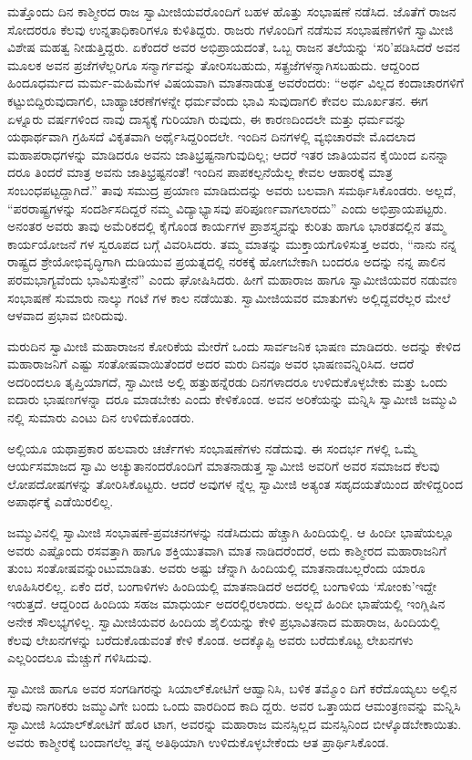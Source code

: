 ಮತ್ತೊಂದು ದಿನ ಕಾಶ್ಮೀರದ ರಾಜ ಸ್ವಾಮೀಜಿಯವರೊಂದಿಗೆ ಬಹಳ ಹೊತ್ತು ಸಂಭಾಷಣೆ ನಡೆಸಿದ. ಜೊತೆಗೆ ರಾಜನ ಸೋದರರೂ ಕೆಲವು ಉನ್ನತಾಧಿಕಾರಿಗಳೂ ಕುಳಿತಿದ್ದರು. ರಾಜರು ಗಳೊಂದಿಗೆ ನಡೆಸುವ ಸಂಭಾಷಣೆಗಳಿಗೆ ಸ್ವಾಮೀಜಿ ವಿಶೇಷ ಮಹತ್ವ ನೀಡುತ್ತಿದ್ದರು. ಏಕೆಂದರೆ ಅವರ ಅಭಿಪ್ರಾಯದಂತೆ, ಒಬ್ಬ ರಾಜನ ತಲೆಯನ್ನು ‘ಸರಿ’ಪಡಿಸಿದರೆ ಅವನ ಮೂಲಕ ಅವನ ಪ್ರಜೆಗಳೆಲ್ಲರಿಗೂ ಸನ್ಮಾರ್ಗವನ್ನು ತೋರಿಸಬಹುದು, ಸತ್ಪ್ರಜೆಗಳನ್ನಾಗಿಸಬಹುದು. ಆದ್ದರಿಂದ ಹಿಂದೂಧರ್ಮದ ಮರ್ಮ-ಮಹಿಮೆಗಳ ವಿಷಯವಾಗಿ ಮಾತನಾಡುತ್ತ ಅವರೆಂದರು: “ಅರ್ಥ ವಿಲ್ಲದ ಕಂದಾಚಾರಗಳಿಗೆ ಕಟ್ಟುಬಿದ್ದಿರುವುದಾಗಲಿ, ಬಾಹ್ಯಾಚರಣೆಗಳನ್ನೇ ಧರ್ಮವೆಂದು ಭಾವಿ ಸುವುದಾಗಲಿ ಕೇವಲ ಮೂರ್ಖತನ. ಈಗ ಏಳ್ನೂರು ವರ್ಷಗಳಿಂದ ನಾವು ದಾಸ್ಯಕ್ಕೆ ಗುರಿಯಾಗಿ ರುವುದು, ಈ ಕಾರಣದಿಂದಲೇ ಮತ್ತು ಧರ್ಮವನ್ನು ಯಥಾರ್ಥವಾಗಿ ಗ್ರಹಿಸದೆ ವಿಕೃತವಾಗಿ ಅರ್ಥೈಸಿದ್ದರಿಂದಲೇ. ಇಂದಿನ ದಿನಗಳಲ್ಲಿ ವ್ಯಭಿಚಾರವೇ ಮೊದಲಾದ ಮಹಾಪರಾಧಗಳನ್ನು ಮಾಡಿದರೂ ಅವನು ಜಾತಿಭ್ರಷ್ಟನಾಗುವುದಿಲ್ಲ; ಆದರೆ ಇತರ ಜಾತಿಯವನ ಕೈಯಿಂದ ಏನನ್ನಾ ದರೂ ತಿಂದರೆ ಮಾತ್ರ ಅವನು ಜಾತಿಭ್ರಷ್ಟನಂತೆ! ಇಂದಿನ ಪಾಪಕಲ್ಪನೆಯೆಲ್ಲ ಕೇವಲ ಆಹಾರಕ್ಕೆ ಮಾತ್ರ ಸಂಬಂಧಪಟ್ಟದ್ದಾಗಿದೆ.” ತಾವು ಸಮುದ್ರ ಪ್ರಯಾಣ ಮಾಡಿದುದನ್ನು ಅವರು ಬಲವಾಗಿ ಸಮರ್ಥಿಸಿಕೊಂಡರು. ಅಲ್ಲದೆ, “ಪರರಾಷ್ಟ್ರಗಳನ್ನು ಸಂದರ್ಶಿಸದಿದ್ದರೆ ನಮ್ಮ ವಿದ್ಯಾಭ್ಯಾಸವು ಪರಿಪೂರ್ಣವಾಗಲಾರದು” ಎಂದು ಅಭಿಪ್ರಾಯಪಟ್ಟರು. ಅನಂತರ ಅವರು ತಾವು ಅಮೆರಿಕದಲ್ಲಿ ಕೈಗೊಂಡ ಕಾರ್ಯಗಳ ಪ್ರಾಶಸ್ತ್ಯವನ್ನು ಕುರಿತು ಹಾಗೂ ಭಾರತದಲ್ಲಿನ ತಮ್ಮ ಕಾರ್ಯಯೋಜನೆ ಗಳ ಸ್ವರೂಪದ ಬಗ್ಗೆ ವಿವರಿಸಿದರು. ತಮ್ಮ ಮಾತನ್ನು ಮುಕ್ತಾಯಗೊಳಿಸುತ್ತ ಅವರು, “ನಾನು ನನ್ನ ರಾಷ್ಟ್ರದ ಶ್ರೇಯೋಭಿವೃದ್ಧಿಗಾಗಿ ದುಡಿಯುವ ಪ್ರಯತ್ನದಲ್ಲಿ ನರಕಕ್ಕೆ ಹೋಗಬೇಕಾಗಿ ಬಂದರೂ ಅದನ್ನು ನನ್ನ ಪಾಲಿನ ಪರಮಭಾಗ್ಯವೆಂದು ಭಾವಿಸುತ್ತೇನೆ” ಎಂದು ಘೋಷಿಸಿದರು. ಹೀಗೆ ಮಹಾರಾಜ ಹಾಗೂ ಸ್ವಾಮೀಜಿಯವರ ನಡುವಣ ಸಂಭಾಷಣೆ ಸುಮಾರು ನಾಲ್ಕು ಗಂಟೆ ಗಳ ಕಾಲ ನಡೆಯಿತು. ಸ್ವಾಮೀಜಿಯವರ ಮಾತುಗಳು ಅಲ್ಲಿದ್ದವರೆಲ್ಲರ ಮೇಲೆ ಆಳವಾದ ಪ್ರಭಾವ ಬೀರಿದುವು.

ಮರುದಿನ ಸ್ವಾಮೀಜಿ ಮಹಾರಾಜನ ಕೋರಿಕೆಯ ಮೇರೆಗೆ ಒಂದು ಸಾರ್ವಜನಿಕ ಭಾಷಣ ಮಾಡಿದರು. ಅದನ್ನು ಕೇಳಿದ ಮಹಾರಾಜನಿಗೆ ಎಷ್ಟು ಸಂತೋಷವಾಯಿತೆಂದರೆ ಅದರ ಮರು ದಿನವೂ ಅವರ ಭಾಷಣವನ್ನಿರಿಸಿದ. ಆದರೆ ಅದರಿಂದಲೂ ತೃಪ್ತಿಯಾಗದೆ, ಸ್ವಾಮೀಜಿ ಅಲ್ಲಿ ಹತ್ತುಹನ್ನೆರಡು ದಿನಗಳಾದರೂ ಉಳಿದುಕೊಳ್ಳಬೇಕು ಮತ್ತು ಒಂದು ಐದಾರು ಭಾಷಣಗಳನ್ನಾ ದರೂ ಮಾಡಬೇಕು ಎಂದು ಕೇಳಿಕೊಂಡ. ಅವನ ಅರಿಕೆಯನ್ನು ಮನ್ನಿಸಿ ಸ್ವಾಮೀಜಿ ಜಮ್ಮುವಿ ನಲ್ಲಿ ಸುಮಾರು ಎಂಟು ದಿನ ಉಳಿದುಕೊಂಡರು.

ಅಲ್ಲಿಯೂ ಯಥಾಪ್ರಕಾರ ಹಲವಾರು ಚರ್ಚೆಗಳು ಸಂಭಾಷಣೆಗಳು ನಡೆದುವು. ಈ ಸಂದರ್ಭ ಗಳಲ್ಲಿ ಒಮ್ಮೆ ಆರ್ಯಸಮಾಜದ ಸ್ವಾಮಿ ಅಚ್ಯುತಾನಂದರೊಂದಿಗೆ ಮಾತನಾಡುತ್ತ ಸ್ವಾಮೀಜಿ ಅವರಿಗೆ ಅವರ ಸಮಾಜದ ಕೆಲವು ಲೋಪದೋಷಗಳನ್ನು ತೋರಿಸಿಕೊಟ್ಟರು. ಆದರೆ ಅವುಗಳ ನ್ನೆಲ್ಲ ಸ್ವಾಮೀಜಿ ಅತ್ಯಂತ ಸಹೃದಯತೆಯಿಂದ ಹೇಳಿದ್ದರಿಂದ ಅಪಾರ್ಥಕ್ಕೆ ಎಡೆಯಿರಲಿಲ್ಲ.

ಜಮ್ಮುವಿನಲ್ಲಿ ಸ್ವಾಮೀಜಿ ಸಂಭಾಷಣೆ-ಪ್ರವಚನಗಳನ್ನು ನಡೆಸಿದುದು ಹೆಚ್ಚಾಗಿ ಹಿಂದಿಯಲ್ಲಿ. ಆ ಹಿಂದೀ ಭಾಷೆಯಲ್ಲೂ ಅವರು ಎಷ್ಟೊಂದು ರಸವತ್ತಾಗಿ ಹಾಗೂ ಶಕ್ತಿಯುತವಾಗಿ ಮಾತ ನಾಡಿದರೆಂದರೆ, ಅದು ಕಾಶ್ಮೀರದ ಮಹಾರಾಜನಿಗೆ ತುಂಬ ಸಂತೋಷವನ್ನುಂಟುಮಾಡಿತು. ಅವರು ಅಷ್ಟು ಚೆನ್ನಾಗಿ ಹಿಂದಿಯಲ್ಲಿ ಮಾತನಾಡಬಲ್ಲರೆಂದು ಯಾರೂ ಊಹಿಸಿರಲಿಲ್ಲ. ಏಕೆಂ ದರೆ, ಬಂಗಾಳಿಗಳು ಹಿಂದಿಯಲ್ಲಿ ಮಾತನಾಡಿದರೆ ಅದರಲ್ಲಿ ಬಂಗಾಳಿಯ ‘ಸೋಂಕು’ಇದ್ದೇ ಇರುತ್ತದೆ. ಆದ್ದರಿಂದ ಹಿಂದಿಯ ಸಹಜ ಮಾಧುರ್ಯ ಅದರಲ್ಲಿರಲಾರದು. ಅಲ್ಲದೆ ಹಿಂದೀ ಭಾಷೆಯಲ್ಲಿ ಇಂಗ್ಲಿಷಿನ ಅನೇಕ ಸೌಲಭ್ಯಗಳಿಲ್ಲ. ಸ್ವಾಮೀಜಿಯವರ ಹಿಂದಿಯ ಶೈಲಿಯನ್ನು ಕೇಳಿ ಪ್ರಭಾವಿತನಾದ ಮಹಾರಾಜ, ಹಿಂದಿಯಲ್ಲಿ ಕೆಲವು ಲೇಖನಗಳನ್ನು ಬರೆದುಕೊಡುವಂತೆ ಕೇಳಿ ಕೊಂಡ. ಅದಕ್ಕೊಪ್ಪಿ ಅವರು ಬರೆದುಕೊಟ್ಟ ಲೇಖನಗಳು ಎಲ್ಲರಿಂದಲೂ ಮೆಚ್ಚುಗೆ ಗಳಿಸಿದುವು.

ಸ್ವಾಮೀಜಿ ಹಾಗೂ ಅವರ ಸಂಗಡಿಗರನ್ನು ಸಿಯಾಲ್​ಕೋಟಿಗೆ ಆಹ್ವಾನಿಸಿ, ಬಳಿಕ ತಮ್ಮೊಂ ದಿಗೆ ಕರೆದೊಯ್ಯಲು ಅಲ್ಲಿನ ಕೆಲವು ನಾಗರಿಕರು ಜಮ್ಮುವಿಗೇ ಬಂದು ಒಂದು ವಾರದಿಂದ ಕಾದಿ ದ್ದರು. ಅವರ ಒತ್ತಾಯದ ಆಮಂತ್ರಣವನ್ನು ಮನ್ನಿಸಿ ಸ್ವಾಮೀಜಿ ಸಿಯಾಲ್​ಕೋಟಿಗೆ ಹೊರ ಟಾಗ, ಅವರನ್ನು ಮಹಾರಾಜ ಮನಸ್ಸಿಲ್ಲದ ಮನಸ್ಸಿನಿಂದ ಬೀಳ್ಕೊಡಬೇಕಾಯಿತು. ಅವರು ಕಾಶ್ಮೀರಕ್ಕೆ ಬಂದಾಗಲೆಲ್ಲ ತನ್ನ ಅತಿಥಿಯಾಗಿ ಉಳಿದುಕೊಳ್ಳಬೇಕೆಂದು ಆತ ಪ್ರಾರ್ಥಿಸಿಕೊಂಡ.

